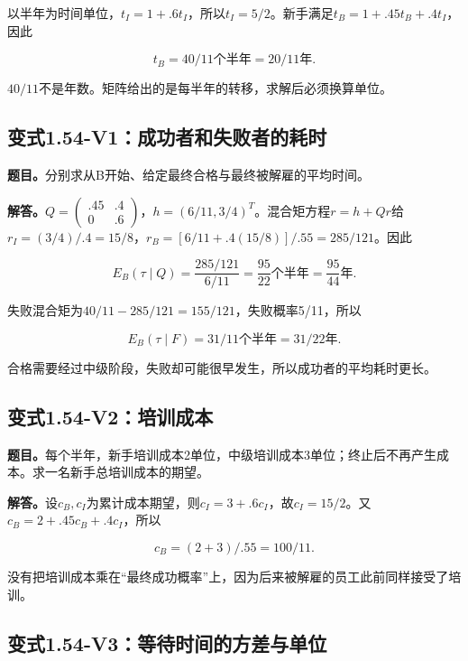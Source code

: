 \documentclass[
  11pt,
  a4paper,
  UTF8,
  fontset=fandol]{ctexart}
\begin{document}
以半年为时间单位，\(t_I=1+.6t_I\)，所以\(t_I=5/2\)。新手满足\(t_B=1+.45t_B+.4t_I\)，因此

\[
\boxed{t_B=40/11\text{个半年}=20/11\text{年}.}
\]

\(40/11\)不是年数。矩阵给出的是每半年的转移，求解后必须换算单位。

\subsection{变式1.54-V1：成功者和失败者的耗时}\label{ux53d8ux5f0f1.54-v1ux6210ux529fux8005ux548cux5931ux8d25ux8005ux7684ux8017ux65f6}

\textbf{题目。}分别求从B开始、给定最终合格与最终被解雇的平均时间。

\textbf{解答。}\(Q=\left(\begin{smallmatrix}.45&.4\\0&.6\end{smallmatrix}\right)\)，\(h=(6/11,3/4)^T\)。混合矩方程\(r=h+Qr\)给\(r_I=(3/4)/.4=15/8\)，\(r_B=[6/11+.4(15/8)]/.55=285/121\)。因此

\[
E_B(\tau\mid Q)=\frac{285/121}{6/11}=\frac{95}{22}\text{个半年}=\frac{95}{44}\text{年}.
\]

失败混合矩为\(40/11-285/121=155/121\)，失败概率5/11，所以

\[
\boxed{E_B(\tau\mid F)=31/11\text{个半年}=31/22\text{年}.}
\]

合格需要经过中级阶段，失败却可能很早发生，所以成功者的平均耗时更长。

\subsection{变式1.54-V2：培训成本}\label{ux53d8ux5f0f1.54-v2ux57f9ux8badux6210ux672c}

\textbf{题目。}每个半年，新手培训成本2单位，中级培训成本3单位；终止后不再产生成本。求一名新手总培训成本的期望。

\textbf{解答。}设\(c_B,c_I\)为累计成本期望，则\(c_I=3+.6c_I\)，故\(c_I=15/2\)。又\(c_B=2+.45c_B+.4c_I\)，所以

\[
\boxed{c_B=(2+3)/.55=100/11.}
\]

没有把培训成本乘在``最终成功概率''上，因为后来被解雇的员工此前同样接受了培训。

\subsection{变式1.54-V3：等待时间的方差与单位}\label{ux53d8ux5f0f1.54-v3ux7b49ux5f85ux65f6ux95f4ux7684ux65b9ux5deeux4e0eux5355ux4f4d}
\end{document}
